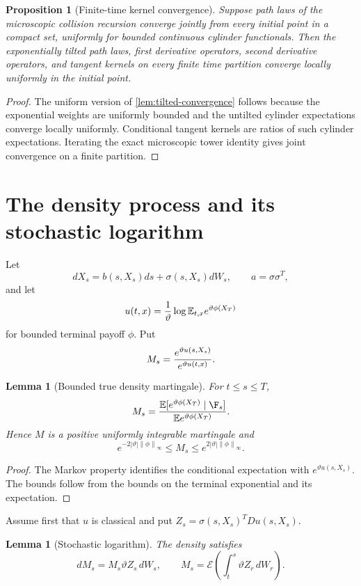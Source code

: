 \documentclass[11pt,reqno]{amsart}
\newtheorem{lemma}[theorem]{Lemma}
\newtheorem{proposition}[theorem]{Proposition}
\theoremstyle{definition}
\newcommand{\E}{\mathbb E}
\newcommand{\norm}[1]{\left\lVert#1\right\rVert}
\newcommand{\abs}[1]{\left\lvert#1\right\rvert}
\begin{document}
\begin{proposition}[Finite-time kernel convergence]\label{prop:kernel-convergence}
Suppose path laws of the microscopic collision recursion converge jointly from
every initial point in a compact set, uniformly for bounded continuous cylinder
functionals.  Then the exponentially tilted path laws, first derivative
operators, second derivative operators, and tangent kernels on every finite
time partition converge locally uniformly in the initial point.
\end{proposition}

\begin{proof}
The uniform version of \cref{lem:tilted-convergence} follows because the
exponential weights are uniformly bounded and the untilted cylinder
expectations converge locally uniformly.  Conditional tangent kernels are
ratios of such cylinder expectations.  Iterating the exact microscopic tower
identity gives joint convergence on a finite partition.
\end{proof}

\section{The density process and its stochastic logarithm}

Let
\[
 dX_s=b(s,X_s)ds+\sigma(s,X_s)dW_s,
 \qquad a=\sigma\sigma^T,
\]
and let
\[
 u(t,x)={1\over\vartheta}\log\E_{t,x}e^{\vartheta\phi(X_T)}
\]
for bounded terminal payoff $\phi$.  Put
\[
 M_s={e^{\vartheta u(s,X_s)}\over e^{\vartheta u(t,x)}}.
\]

\begin{lemma}[Bounded true density martingale]\label{lem:bounded-density}
For $t\le s\le T$,
\[
 M_s={\E[e^{\vartheta\phi(X_T)}\mid\F_s]
 \over\E e^{\vartheta\phi(X_T)}}.
\]
Hence $M$ is a positive uniformly integrable martingale and
\[
 e^{-2\abs\vartheta\norm\phi_\infty}
 \le M_s\le
 e^{2\abs\vartheta\norm\phi_\infty}.
\]
\end{lemma}

\begin{proof}
The Markov property identifies the conditional expectation with
$e^{\vartheta u(s,X_s)}$.  The bounds follow from the bounds on the terminal
exponential and its expectation.
\end{proof}

Assume first that $u$ is classical and put
$Z_s=\sigma(s,X_s)^TDu(s,X_s)$.

\begin{lemma}[Stochastic logarithm]\label{lem:stochastic-log}
The density satisfies
\[
 dM_s=M_s\vartheta Z_s\,dW_s,
 \qquad
 M_s=\mathcal E\left(\int_t^s\vartheta Z_r\,dW_r\right).
\]
\end{lemma}
\end{document}
